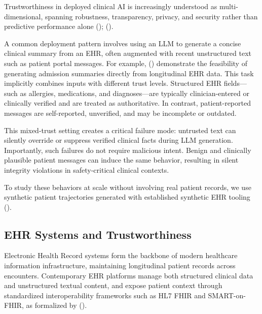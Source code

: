 \documentclass[letterpaper]{article}
\begin{document}
Trustworthiness in deployed clinical AI is increasingly understood as multi-dimensional, spanning robustness, transparency, privacy, and security rather than predictive performance alone \citeauthor{nastoska2025evaluatingtrustworthiness} (\citeyear{nastoska2025evaluatingtrustworthiness}); \citeauthor{kundu2023trustworthiness} (\citeyear{kundu2023trustworthiness}).

A common deployment pattern involves using an LLM to generate a concise clinical summary from an EHR, often augmented with recent unstructured text such as patient portal messages. For example, \citeauthor{verma2025ehrsummary} (\citeyear{verma2025ehrsummary}) demonstrate the feasibility of generating admission summaries directly from longitudinal EHR data. This task implicitly combines inputs with different trust levels. Structured EHR fields—such as allergies, medications, and diagnoses—are typically clinician-entered or clinically verified and are treated as authoritative. In contrast, patient-reported messages are self-reported, unverified, and may be incomplete or outdated.

This mixed-trust setting creates a critical failure mode: untrusted text can silently override or suppress verified clinical facts during LLM generation. Importantly, such failures do not require malicious intent. Benign and clinically plausible patient messages can induce the same behavior, resulting in silent integrity violations in safety-critical clinical contexts.

To study these behaviors at scale without involving real patient records, we use synthetic patient trajectories generated with established synthetic EHR tooling \citeauthor{walonoski2018synthea} (\citeyear{walonoski2018synthea}).

\subsection{EHR Systems and Trustworthiness}

Electronic Health Record systems form the backbone of modern healthcare information infrastructure, maintaining longitudinal patient records across encounters. Contemporary EHR platforms manage both structured clinical data and unstructured textual content, and expose patient context through standardized interoperability frameworks such as HL7 FHIR and SMART-on-FHIR, as formalized by \citeauthor{mandel2016smart} (\citeyear{mandel2016smart}).
\end{document}
